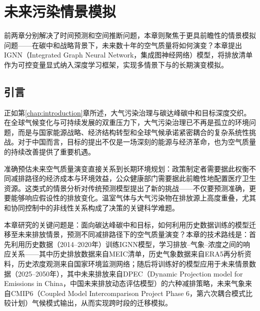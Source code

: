 
\chapter{未来污染情景模拟}
\label{chap:simulation}

前两章分别解决了时间预测和空间推断问题，本章则聚焦于更具前瞻性的情景模拟问题——在碳中和战略背景下，未来数十年的空气质量将如何演变？本章提出IGNN（Integrated Graph Neural Network，集成图神经网络）模型\citep{zhang2026ignn}，将排放清单作为可控变量显式纳入深度学习框架，实现多情景下\PM 与\ozone 的长期演变模拟。

\section{引言}
\label{sec:sim_intro}

正如第\ref{chap:introduction}章所述，大气污染治理与碳达峰碳中和目标深度交织。在全球气候变化与可持续发展的双重压力下，大气污染治理已不再是孤立的环境问题，而是与国家能源战略、经济结构转型和全球气候承诺紧密耦合的复杂系统性挑战。对于中国而言，目标的提出不仅是一场深刻的能源与经济革命，也为空气质量的持续改善提供了重要机遇。

准确预估未来空气质量演变直接关系到长期环境规划：政策制定者需要据此权衡不同减排路径的经济成本与环境效益，公众健康部门需要据此前瞻性地配置医疗卫生资源。这类式的情景分析对传统预测模型提出了新的挑战——不仅要预测准确，更要能够响应假设性的排放变化。温室气体与大气污染物在排放源上高度重叠，尤其\PM 和\ozone 协同控制中的非线性关系构成了决策的关键科学难题。

本章研究的关键问题是：面向碳达峰碳中和目标，如何利用历史数据训练的模型迁移至未来排放情景，预测不同减排路径下的空气质量演变？本章的技术路线是：首先利用历史数据（2014--2020年）训练IGNN模型，学习排放--气象--浓度之间的响应关系——其中历史排放数据来自MEIC清单，历史气象数据来自ERA5再分析资料，历史浓度观测来自国家环境监测网络；随后将训练好的模型应用于未来情景数据（2025--2050年），其中未来排放来自DPEC（Dynamic Projection model for Emissions in China，中国未来排放动态评估模型）的六种减排策略，未来气象来自CMIP6（Coupled Model Intercomparison Project Phase 6，第六次耦合模式比较计划）气候模式输出，从而实现跨时段的迁移模拟。

